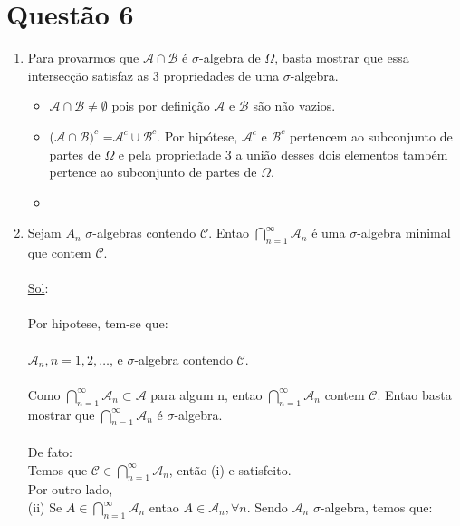 \documentclass[a4paper,12pt]{report}
\begin{document}
		\section{Questão 6}
		\begin{enumerate}[label=\alph*)]
			\item
			Para provarmos que $\mathscr A \cap \mathscr B$  é  $\sigma$-algebra de $\Omega$, basta mostrar que essa intersecção satisfaz as 3 propriedades de uma $\sigma$-algebra.\\
			\begin{itemize}
				\item  $\mathscr A \cap \mathscr B\ne \emptyset $ pois  por definição $\mathscr A$ e $\mathscr B$ são não vazios.
				
				\item ($\mathscr A \cap \mathscr B)^c$ =$\mathscr A^c \cup \mathscr B^c$. Por hipótese, $\mathscr A^c $ e $ \mathscr B^c$ pertencem ao subconjunto de partes de $\Omega$ e pela propriedade 3 a união desses dois elementos também pertence ao subconjunto de partes de $\Omega$.
				\item 
			\end{itemize}
			\item
		Sejam $A_n$ $\sigma$-algebras contendo $\mathscr{C}$. Entao $\bigcap\limits_{n=1}^\infty \mathscr{A}_n$ é uma $\sigma$-algebra minimal que contem $\mathscr{C}$.\\
		\\
		\underline{Sol}:\\
		\\
		Por hipotese, tem-se que:\\
		\\
		$\mathscr{A}_n, n=1,2,\ldots$, e $\sigma$-algebra contendo $\mathscr{C}$.\\
		\\
		Como  $\bigcap\limits_{n=1}^\infty \mathscr{A}_n \subset \mathscr{A}$ para algum n, entao  $\bigcap\limits_{n=1}^\infty \mathscr{A}_n$ contem $\mathscr{C}$. Entao basta mostrar que  $\bigcap\limits_{n=1}^\infty \mathscr{A}_n$ é $\sigma$-algebra.\\
		\\
		De fato:\\
		Temos que $\mathscr{C} \in \bigcap\limits_{n=1}^\infty \mathscr{A}_n$, então (i) e satisfeito.\\
		Por outro lado,\\
		(ii) Se $A \in \bigcap\limits_{n=1}^\infty \mathscr{A}_n$  entao $A\in \mathscr{A}_n, \forall n$. Sendo $\mathscr{A}_n$ $\sigma$-algebra, temos que:\\

\end{enumerate}
\end{document}
